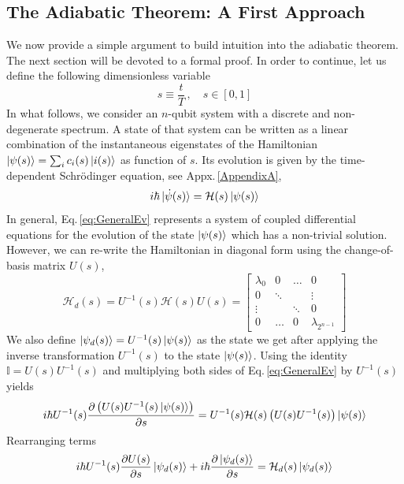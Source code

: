 \subsection{The Adiabatic Theorem: A First Approach}
We now provide a simple argument to build intuition into the adiabatic theorem. The next section will be devoted to a formal proof. In order to continue, let us define the following dimensionless variable
\begin{equation}
    s \equiv \frac{t}{T}\, , \quad s \in [0,1]
\end{equation}
In what follows, we consider an $n$-qubit system with a discrete and non-degenerate spectrum. A state of that system can be written as a linear combination of the instantaneous eigenstates of the Hamiltonian $\ket{\psi(s)} = \sum_{i}c_{i}(s)\ket{i(s)}$ as function of $s$. Its evolution is given by the time-dependent Schrödinger equation, see Appx.\,\ref{AppendixA},
\begin{equation}
\label{eq:GeneralEv}
    i\hbar \ket{\dot{\psi}(s)} = \mathcal{H}(s) \ket{\psi(s)}
\end{equation}
In general, Eq.\,\eqref{eq:GeneralEv} represents a system of coupled differential equations for the evolution of the state $\ket{\psi(s)}$ which has a non-trivial solution. However, we can re-write the Hamiltonian in diagonal form using the change-of-basis matrix $U(s)$,
\begin{equation}
    \mathcal{H}_{d}(s) = U^{-1}(s)\mathcal{H}(s)U(s) = \begin{bmatrix}
           \lambda_{0} & 0 & \hdots & 0 \\
           0 &  \ddots & & \vdots \\
           \vdots &   & \ddots & 0 \\
           0 & \hdots & 0 & \lambda_{2^{n-1}}
         \end{bmatrix}
\end{equation}
We also define $\ket{\psi_{d}(s)} = U^{-1}(s)\ket{\psi(s)}$ as the state we get after applying the inverse transformation $U^{-1}(s)$ to the state $\ket{\psi(s)}$. Using the identity $\mathbb{I} = U(s)U^{-1}(s)$ and multiplying both sides of Eq.\,\eqref{eq:GeneralEv} by $U^{-1}(s)$ yields
\begin{equation}
     i\hbar U^{-1}(s) \frac{\partial \left(U(s)U^{-1}(s)\ket{\psi(s)}\right)}{\partial s} = U^{-1}(s)\mathcal{H}(s) \left(U(s)U^{-1}(s)\right)\ket{\psi(s)}
\end{equation}
Rearranging terms
\begin{equation}
     i\hbar U^{-1}(s) \frac{\partial U(s)}{\partial s}\ket{\psi_{d}(s)} + i\hbar  \frac{\partial \ket{\psi_{d}(s)}}{\partial s}= \mathcal{H}_{d}(s)\ket{\psi_{d}(s)}
\end{equation}
